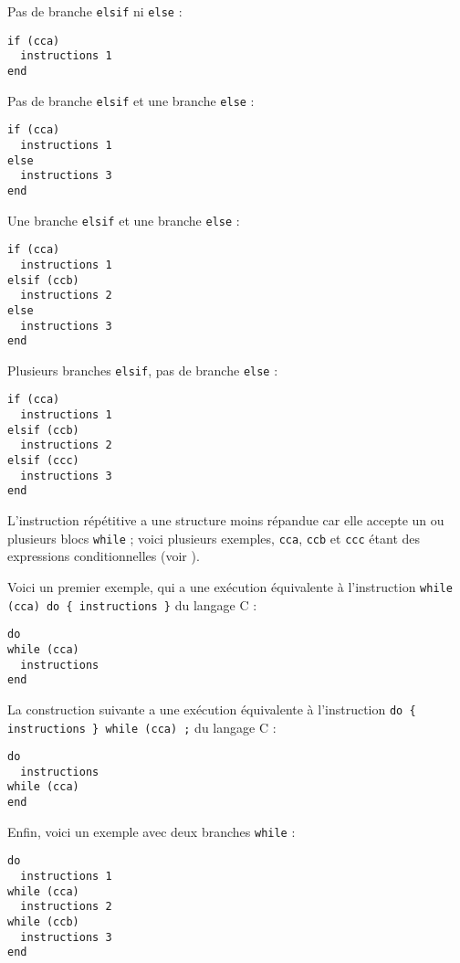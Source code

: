 Pas de branche \texttt{elsif} ni \texttt{else} :
\begin{lstlisting}[language=piccolo]
if (cca)
  instructions 1
end
\end{lstlisting}

Pas de branche \texttt{elsif} et une branche \texttt{else} :
\begin{lstlisting}[language=piccolo]
if (cca)
  instructions 1
else
  instructions 3
end
\end{lstlisting}

Une branche \texttt{elsif} et une branche \texttt{else} :
\begin{lstlisting}[language=piccolo]
if (cca)
  instructions 1
elsif (ccb)
  instructions 2
else
  instructions 3
end
\end{lstlisting}

Plusieurs branches \texttt{elsif}, pas de branche \texttt{else} :
\begin{lstlisting}[language=piccolo]
if (cca)
  instructions 1
elsif (ccb)
  instructions 2
elsif (ccc)
  instructions 3
end
\end{lstlisting}










L'instruction répétitive a une structure moins répandue car elle accepte un ou plusieurs blocs \texttt{while} ; voici plusieurs exemples, \texttt{cca}, \texttt{ccb} et \texttt{ccc} étant des expressions conditionnelles (voir ).


Voici un premier exemple, qui a une exécution équivalente à l'instruction \texttt{while (cca) do \{ instructions \}} du langage C :
\begin{lstlisting}[language=piccolo]
do
while (cca)
  instructions
end
\end{lstlisting}

La construction suivante a une exécution équivalente à l'instruction \texttt{do \{ instructions \} while (cca) ;} du langage C :
\begin{lstlisting}[language=piccolo]
do
  instructions
while (cca)
end
\end{lstlisting}

Enfin, voici un exemple avec deux branches \texttt{while} :
\begin{lstlisting}[language=piccolo]
do
  instructions 1
while (cca)
  instructions 2
while (ccb)
  instructions 3
end
\end{lstlisting}

